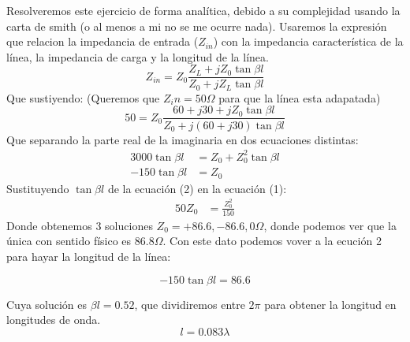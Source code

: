 
Resolveremos este ejercicio de forma analítica, debido a su complejidad usando la carta de smith (o al menos a mi no se me ocurre nada).
Usaremos la expresión que relacion la impedancia de entrada ($Z_{in}$) con la impedancia característica de la línea, la impedancia de carga y la longitud de la línea.
\[Z_{in} = Z_0 \frac{Z_L + jZ_0 \tan{ \beta l} }{Z_0 + jZ_L \tan{ \beta l} } \]
Que sustiyendo: (Queremos que $Z_in = 50 \Omega$ para que la línea esta adapatada)
\[50 = Z_0 \frac{60+j30  + jZ_0 \tan{ \beta l} }{Z_0 + j(60+j30 ) \tan{ \beta l} } \]
Que separando la parte real de la imaginaria en dos ecuaciones distintas:
\begin{align}
  3000 \tan{ \beta l} &= Z_0 + Z_0^2 \tan{ \beta l} \\
  -150 \tan{ \beta l} &= Z_0
\end{align}
Sustituyendo $\tan{ \beta l}$ de la ecuación (2) en la ecuación (1):
\begin{align*}
  50 Z_0 &= \frac{Z_0^2}{150}
\end{align*}
Donde obtenemos 3 soluciones $Z_0 = +86.6, -86.6, 0 \Omega$, donde podemos ver que la única con sentido físico es $86.8 \Omega$. Con este dato podemos vover a la ecución 2 para hayar la longitud de la línea:

\[-150 \tan{ \beta l} = 86.6 \]

Cuya solución es $\beta l = 0.52$, que dividiremos entre $2 \pi$ para obtener la longitud en longitudes de onda.
\[l = 0.083 \lambda\]

